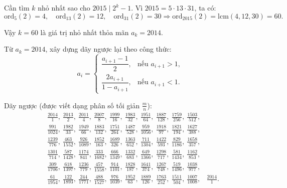 \begin{problem}
\begin{soln}
    Cần tìm \( k \) nhỏ nhất sao cho \( 2015 \mid 2^k - 1 \). Vì \( 2015 = 5 \cdot 13 \cdot 31 \), ta có:
    \[
        \text{ord}_{5}(2) = 4, \quad \text{ord}_{13}(2) = 12, \quad \text{ord}_{31}(2) = 30 \Rightarrow \text{ord}_{2015}(2) = \text{lcm}(4, 12, 30) = 60.
    \]

    Vậy \( k = 60 \) là giá trị nhỏ nhất thỏa mãn \( a_k = 2014 \).
\end{soln}

\newpage

\begin{soln}
    Từ \( a_k = 2014 \), xây dựng dãy ngược lại theo công thức:
    \[
        a_i = 
        \begin{cases}
            \dfrac{a_{i+1} - 1}{2}, &\text{nếu } a_{i+1} > 1, \\
            \dfrac{2a_{i+1}}{1 - a_{i+1}}, &\text{nếu } a_{i+1} < 1.
        \end{cases}
    \]

    Dãy ngược (được viết dạng phân số tối giản \( \frac{m}{n} \)):
    \[
        \begin{aligned}
            &\frac{2014}{1},\ \frac{2013}{2},\ \frac{2011}{4},\ \frac{2007}{8},\ \frac{1999}{16},\ \frac{1983}{32},\ \frac{1951}{64},\ \frac{1887}{128},\ \frac{1759}{256},\ \frac{1503}{512},\\
            &\frac{991}{1024},\ \frac{1982}{33},\ \frac{1949}{66},\ \frac{1883}{132},\ \frac{1751}{264},\ \frac{1487}{528},\ \frac{959}{1056},\ \frac{1918}{97},\ \frac{1821}{194},\ \frac{1627}{388},\\
            &\frac{1239}{776},\ \frac{463}{1552},\ \frac{926}{1089},\ \frac{1852}{163},\ \frac{1689}{326},\ \frac{1363}{652},\ \frac{711}{1304},\ \frac{1422}{593},\ \frac{829}{1186},\ \frac{1658}{357},\\
            &\frac{1301}{714},\ \frac{587}{1428},\ \frac{1174}{841},\ \frac{333}{1682},\ \frac{666}{1349},\ \frac{1332}{683},\ \frac{649}{1366},\ \frac{1298}{717},\ \frac{581}{1434},\ \frac{1162}{853},\\
            &\frac{309}{1706},\ \frac{618}{1397},\ \frac{1236}{779},\ \frac{457}{1558},\ \frac{914}{1101},\ \frac{1828}{187},\ \frac{1641}{374},\ \frac{1267}{748},\ \frac{519}{1496},\ \frac{1038}{977},\\
            &\frac{61}{1954},\ \frac{122}{1893},\ \frac{244}{1771},\ \frac{488}{1527},\ \frac{976}{1039},\ \frac{1952}{63},\ \frac{1889}{126},\ \frac{1763}{252},\ \frac{1511}{504},\ \frac{1007}{1008},
            &\frac{2014}{1}.
        \end{aligned}
    \]


\end{soln}
\end{problem}

